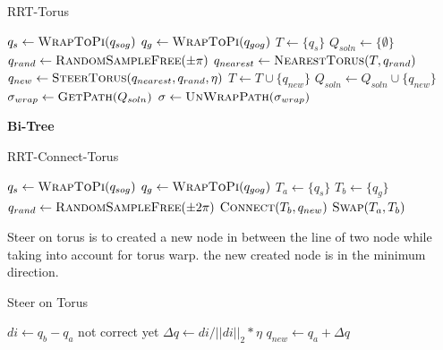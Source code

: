\begin{algorithm}[!h]
    \small
    \caption{RRT-Torus}

    \begin{algorithmic}
        \State $q_s \gets \textsc{WrapToPi}(q_{sog})$
        \State $q_g \gets \textsc{WrapToPi}(q_{gog})$
        \State $T \gets \{q_{s}\}$
        \State $Q_{soln} \gets \{\emptyset\}$
        \State $q_{rand} \gets \textsc{RandomSampleFree}(\pm \pi)$
        \State $q_{nearest} \gets \textsc{NearestTorus}(T,q_{rand})$
        \State $q_{new} \gets \textsc{SteerTorus}(q_{nearest}, q_{rand}, \eta)$
        \State $T \gets T \cup \{q_{new}\}$
        \State $Q_{soln} \gets Q_{soln} \cup \{q_{new}\}$
        \EndIf
        \EndIf
        \EndFor
        \State $\sigma_{wrap} \gets \textsc{GetPath}(Q_{soln})$
        \State \Return $\sigma \gets \textsc{UnWrapPath}(\sigma_{wrap})$
    \end{algorithmic}
\end{algorithm}



\textbf{Bi-Tree}


\begin{algorithm}[!h]
    \small
    \caption{RRT-Connect-Torus}

    \begin{algorithmic}
        \State $q_s \gets \textsc{WrapToPi}(q_{sog})$
        \State $q_g \gets \textsc{WrapToPi}(q_{gog})$
        \State $T_a \gets \{q_{s}\}$
        \State $T_b \gets \{q_{g}\}$
        \State $q_{rand} \gets \textsc{RandomSampleFree}(\pm 2\pi)$
        \State $\textsc{Connect}(T_b, q_{new})$
        \EndIf
        \State $\textsc{Swap}(T_a,T_b)$
        \EndFor
    \end{algorithmic}
\end{algorithm}



Steer on torus is to created a new node in between the line of two node while taking into account for torus warp. the new created node is in the minimum direction.

\begin{algorithm}[!h]
    \small
    \caption{Steer on Torus}

    \begin{algorithmic}
        \State $di \gets q_b - q_a $ not correct yet
        \State $\Delta q \gets di/||di||_2 * \eta $
        \State $q_{new} \gets q_a + \Delta q$
        \EndFunction
    \end{algorithmic}
\end{algorithm}



